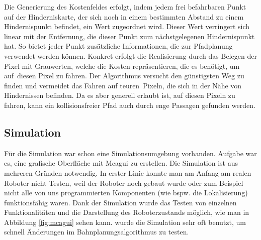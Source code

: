 Die Generierung des Kostenfeldes erfolgt, indem jedem frei befahrbaren Punkt auf der Hinderniskarte, der sich noch in einem bestimmten Abstand zu einem Hindernispunkt befindet, ein Wert zugeordnet wird.
Dieser Wert verringert sich linear mit der Entfernung, die dieser Punkt zum nächstgelegenen Hindernispunkt hat.
So bietet jeder Punkt zusätzliche Informationen, die zur Pfadplanung verwendet werden können.
Konkret erfolgt die Realisierung durch das Belegen der Pixel mit Grauwerten, welche die Kosten repräsentieren, die es benötigt, um \glqq auf\grqq\ diesen Pixel zu fahren.
Der Algorithmus versucht den günstigsten Weg zu finden und vermeidet das Fahren auf \glqq teuren\grqq\ Pixeln, die sich in der Nähe von Hindernissen befinden. Da es aber generell erlaubt ist, auf diesen Pixeln zu fahren, kann ein kollisionsfreier Pfad auch durch enge Passagen gefunden werden.



\subsection{Simulation}
\label{simulation_subsec}
\authorsection{\editoroier}

Für die Simulation war schon eine Simulationsumgebung vorhanden.
Aufgabe war es, eine grafische Oberfläche mit Mcagui zu erstellen.
Die Simulation ist aus mehreren Gründen notwendig.
In erster Linie konnte man am Anfang am realen Roboter nicht Testen, weil der Roboter noch gebaut wurde oder zum Beispiel nicht alle von uns programmierten Komponenten (wie bspw. die Lokalisierung) funktionsfähig waren.
Dank der Simulation wurde das Testen von einzelnen Funktionalitäten und die Darstellung des Roboterzustands möglich, wie man in Abbildung \ref{fig:mcagui} sehen kann.
\ZB wurde die Simulation sehr oft benutzt, um schnell Änderungen im Bahnplanungsalgorithmus zu testen.

